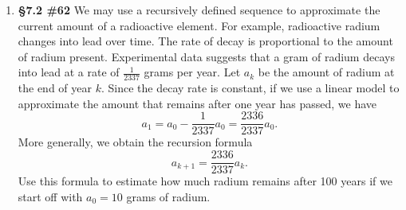 \documentclass[%
]{article}
\begin{document}
\begin{enumerate}
\item {\bf \S7.2 \#62} We may use a recursively defined sequence to approximate the current amount of a radioactive element.  For example, radioactive radium changes into lead over time.  The rate of decay is proportional to the amount of radium present.  Experimental data suggests that a gram of radium decays into lead at a rate of $\frac{1}{2337}$ grams per year.  Let $a_k$ be the amount of radium at the end of year $k$.  Since the decay rate is constant, if we use a linear model to approximate the amount that remains after one year has passed, we have
\[
a_1=a_0-\frac{1}{2337}a_0=\frac{2336}{2337}a_0.
\] 
More generally, we obtain the recursion formula 
\[
a_{k+1}=\frac{2336}{2337}a_k.
\]
Use this formula to estimate how much radium remains after 100 years if we start off with $a_0=10$ grams of radium.
	
\end{enumerate}
\end{document}
